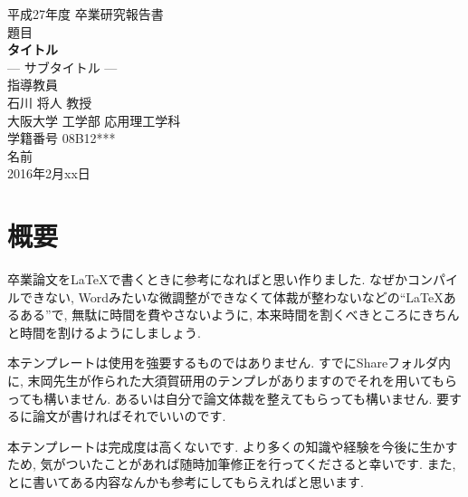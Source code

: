 \begin{titlepage}
\centering
\vspace*{40truept}
{\Large 平成27年度 卒業研究報告書} \\ %
\vspace{40truept} 
 {\Large 題目} \\
 \vspace{10truept} 
{\LARGE \textbf{タイトル}}\\ %
\vspace{10truept}
{\Large --- サブタイトル ---}\\ %
\vspace{120truept}
{\Large 指導教員}\\ %
 \vspace{10truept} 
{\Large 石川 将人 教授}\\ %
\vspace{60truept}
{\Large 大阪大学 工学部 応用理工学科}\\ %
 \vspace{10truept} 
{\Large 学籍番号 08B12***}\\ %
\vspace{20truept}
{\LARGE 名前}\\ %
\vspace{80truept}
{\Large 2016年2月xx日} %
\end{titlepage}
\cleardoublepage
\chapter*{\huge 概要}
\Cvs

卒業論文を\LaTeX で書くときに参考になればと思い作りました. なぜかコンパイルできない, Wordみたいな微調整ができなくて体裁が整わないなどの``\LaTeX あるある''で, 無駄に時間を費やさないように, 本来時間を割くべきところにきちんと時間を割けるようにしましょう. 

本テンプレートは使用を強要するものではありません. すでにShareフォルダ内に, 末岡先生が作られた大須賀研用のテンプレがありますのでそれを用いてもらっても構いません. あるいは自分で論文体裁を整えてもらっても構いません. 要するに論文が書ければそれでいいのです. 

本テンプレートは完成度は高くないです. より多くの知識や経験を今後に生かすため, 気がついたことがあれば随時加筆修正を行ってくださると幸いです. また, とに書いてある内容なんかも参考にしてもらえればと思います. 

